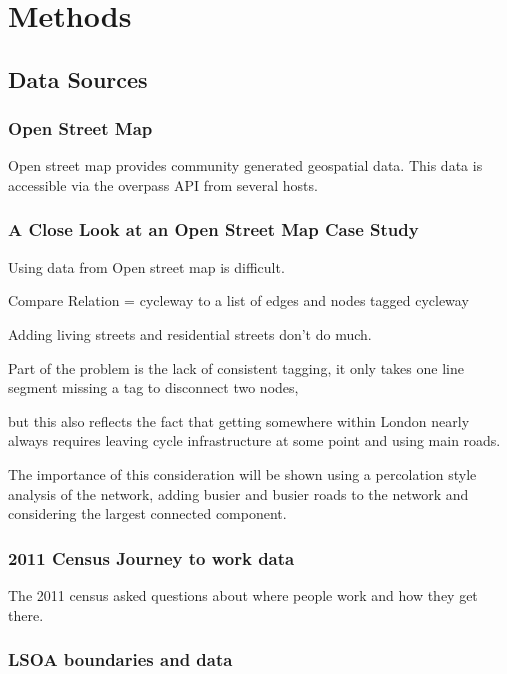 \documentclass[11pt]{article} %
\begin{document}
\section{Methods}

\subsection{Data Sources}

\subsubsection{Open Street Map}

Open street map provides community generated geospatial data. This data is accessible via the overpass API from several hosts. 

\subsubsection{A Close Look at an Open Street Map Case Study}

Using data from Open street map is difficult. 

Compare Relation = cycleway to a list of edges and nodes tagged cycleway

Adding living streets and residential streets don't do much. 

Part of the problem is the lack of consistent tagging, it only takes one line segment missing a tag to disconnect two nodes,

but this also reflects the fact that getting somewhere within London nearly always requires leaving cycle infrastructure at some point and using main roads. 

The importance of this consideration will be shown using a percolation style analysis of the network, adding busier and busier roads to the network and considering the largest connected component. 

\subsubsection{2011 Census Journey to work data}

The 2011 census asked questions about where people work and how they get there. 

\subsubsection{LSOA boundaries and data}
\end{document}

